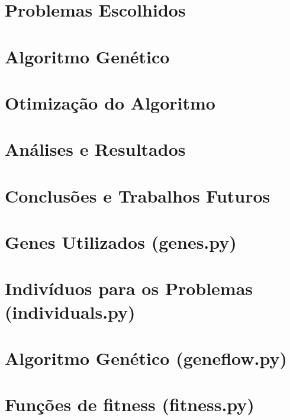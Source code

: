 \documentclass[12pt,plainheader,pnumplain]{abnt}
\newcommand{\oes}{\~oes }
\newcommand{\src}{src/experiments}
\begin{document}
\chapter{Problemas Escolhidos}


\chapter{Algoritmo Gen\'etico}


\chapter{Otimização do Algoritmo}


\chapter{An\'alises e Resultados}


\chapter{Conclus\oes e Trabalhos Futuros}





\appendix

\newpage
\chapter{Genes Utilizados (genes.py)}
\label{appendix:genes}


\newpage
\chapter{Indivíduos para os Problemas (individuals.py)}
\label{appendix:genes}


\newpage
\chapter{Algoritmo Genético (geneflow.py)}
\label{appendix:geneflow}


\newpage
\chapter{Funções de fitness (fitness.py)}
\label{appendix:fitness}

\end{document}

